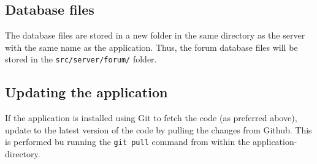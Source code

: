 \documentclass[a4paper, 12pt, titlepage]{article}
\begin{document}
	\subsection{Database files}
	The database files are stored in a new folder in the same directory as the server with the same name as the application. Thus, the forum database files will be stored in the \lstinline{src/server/forum/} folder.

	\subsection{Updating the application}
	If the application is installed using Git to fetch the code (as preferred above), update to the latest version of the code by pulling the changes from Github. This is performed bu running the \lstinline{git pull} command from within the application-directory.
\end{document}
